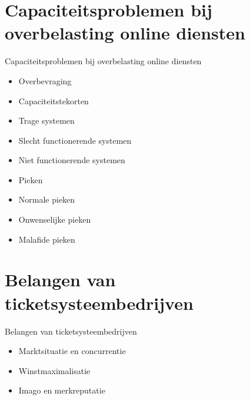 \documentclass{beamer}
\begin{document}
\section[Capaciteitsproblemen]{Capaciteitsproblemen bij overbelasting online diensten}
\begin{frame}{Capaciteitsproblemen bij overbelasting online diensten}
    \begin{itemize}
        \item Overbevraging
        \item Capaciteitstekorten
        \item Trage systemen
        \item Slecht functionerende systemen
        \item Niet functionerende systemen
        \item Pieken
        \item Normale pieken
        \item Onwenselijke pieken
        \item Malafide pieken
    \end{itemize}
\end{frame}

\section[Bedrijf]{Belangen van ticketsysteembedrijven}
\begin{frame}{Belangen van ticketsysteembedrijven}
    \begin{itemize}
        \item Marktsituatie en concurrentie
        \item Winstmaximalisatie
        \item Imago en merkreputatie
    \end{itemize}
\end{frame}
\end{document}
